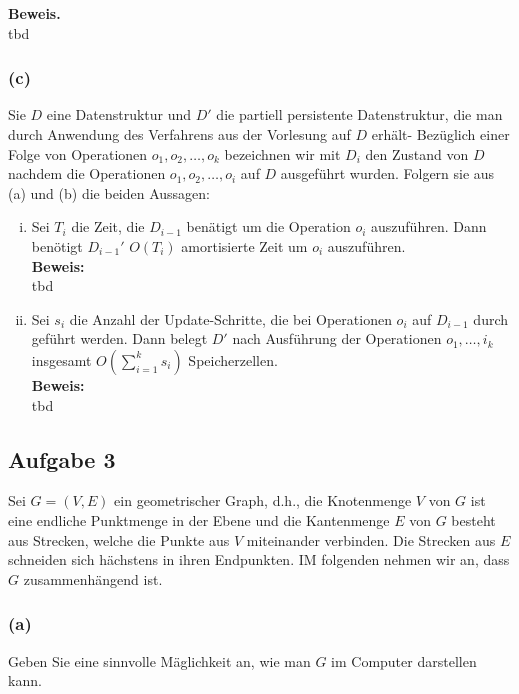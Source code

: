 \documentclass[11pt,a4paper,ngerman]{article}
\begin{document}
\noindent\textbf{Beweis.}\\
tbd

\subsubsection*{(c)}
Sie $D$ eine Datenstruktur und $D'$ die partiell persistente Datenstruktur, die man durch Anwendung des Verfahrens aus der Vorlesung auf $D$ erhält- Bezüglich einer Folge von Operationen $o_1, o_2, \ldots, o_k$ bezeichnen wir mit $D_i$ den Zustand von $D$ nachdem die Operationen $o_1, o_2, \ldots, o_i$ auf $D$ ausgeführt wurden. Folgern sie aus (a) und (b) die beiden Aussagen:

\begin{enumerate}[(i)]
   \item Sei $T_i$ die Zeit, die $D_{i-1}$ benätigt um die Operation $o_i$ auszuführen. Dann benötigt $D_{i-1}'$ $O(T_i)$ amortisierte Zeit um $o_i$ auszuführen.\\

   \noindent\textbf{Beweis:}\\
      tbd

   \item Sei $s_i$ die Anzahl der Update-Schritte, die bei Operationen $o_i$ auf $D_{i-1}$ durch geführt werden. Dann belegt $D'$ nach Ausführung der Operationen $o_1, \ldots, i_k$ insgesamt $O(\sum_{i=1}^k s_i)$ Speicherzellen.\\
   \noindent\textbf{Beweis:}\\
      tbd

\end{enumerate}


\subsection*{Aufgabe 3}
   Sei $G = (V,E)$ ein geometrischer Graph, d.h., die Knotenmenge $V$ von $G$ ist eine endliche Punktmenge in der Ebene und die Kantenmenge $E$ von $G$ besteht aus Strecken, welche die Punkte aus $V$ miteinander verbinden. Die Strecken aus $E$ schneiden sich hächstens in ihren Endpunkten. IM folgenden nehmen wir an, dass $G$ zusammenhängend ist.

\subsubsection*{(a)}
Geben Sie eine sinnvolle Mäglichkeit an, wie man $G$ im Computer darstellen kann.\\
\end{document}
